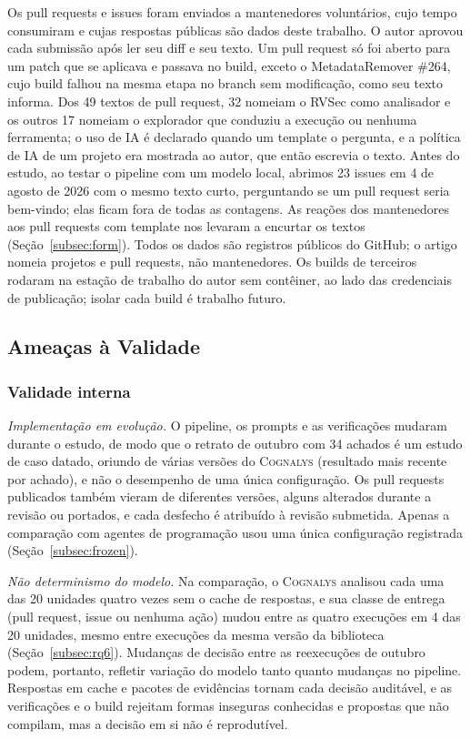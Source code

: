 \documentclass[conference]{IEEEtran}
\newcommand{\system}{\textsc{Cognalys}}
\begin{document}
Os pull requests e issues foram enviados a mantenedores voluntários, cujo tempo
consumiram e cujas respostas públicas são dados deste trabalho. O autor aprovou cada
submissão após ler seu diff e seu texto. Um pull request só foi aberto para
um patch que se aplicava e passava no build, exceto o MetadataRemover \#264, cujo build
falhou na mesma etapa no branch sem modificação, como seu texto informa. Dos
49 textos de pull request, 32 nomeiam o RVSec como analisador e os outros 17 nomeiam o
explorador que conduziu a execução ou nenhuma ferramenta; o uso de IA é declarado quando um
template o pergunta, e a política de IA de um projeto era mostrada ao autor, que então
escrevia o texto. Antes do estudo, ao testar o pipeline com um
modelo local, abrimos 23 issues em 4 de agosto de 2026 com o mesmo texto curto,
perguntando se um pull request seria bem-vindo; elas ficam fora de todas as contagens. As reações dos mantenedores aos pull
requests com template nos levaram a encurtar os textos (Seção~\ref{subsec:form}). Todos os dados são registros públicos do GitHub; o artigo
nomeia projetos e pull requests, não mantenedores. Os builds de terceiros rodaram na
estação de trabalho do autor sem contêiner, ao lado das credenciais de
publicação; isolar cada build é trabalho futuro.

\subsection{Ameaças à Validade}
\label{subsec:threats}

\subsubsection{Validade interna}

\emph{Implementação em evolução.} O pipeline, os prompts e as verificações mudaram durante
o estudo, de modo que o retrato de outubro com 34 achados é um estudo de caso datado, oriundo de
várias versões do \system{} (resultado mais recente por achado), e não o desempenho
de uma única configuração. Os pull requests publicados também vieram de diferentes
versões, alguns alterados durante a revisão ou portados, e cada desfecho é atribuído à
revisão submetida. Apenas a comparação com agentes de
programação usou uma única configuração registrada (Seção~\ref{subsec:frozen}).

\emph{Não determinismo do modelo.} Na comparação, o \system{} analisou cada uma
das 20 unidades quatro vezes sem o cache de respostas, e sua classe de entrega
(pull request, issue ou nenhuma ação) mudou entre as quatro execuções em 4 das
20 unidades, mesmo entre execuções da mesma versão da biblioteca (Seção~\ref{subsec:rq6}).
Mudanças de decisão entre as reexecuções de outubro podem, portanto, refletir variação do modelo
tanto quanto mudanças no pipeline. Respostas em cache e pacotes de evidências tornam cada
decisão auditável, e as verificações e o build rejeitam formas inseguras conhecidas e propostas que não compilam,
mas a decisão em si não é reprodutível.
\end{document}
